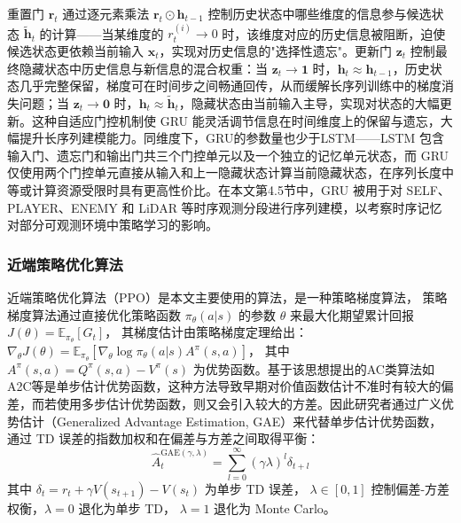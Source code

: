 \documentclass[12pt, a4paper, UTF8]{ctexart}
\numberwithin{equation}{section}
\begin{document}
重置门 $\mathbf{r}_t$ 通过逐元素乘法 $\mathbf{r}_t \odot \mathbf{h}_{t-1}$ 控制历史状态中哪些维度的信息参与候选状态 $\tilde{\mathbf{h}}_t$ 的计算——当某维度的 $r_t^{(i)} \to 0$ 时，该维度对应的历史信息被阻断，迫使候选状态更依赖当前输入 $\mathbf{x}_t$，实现对历史信息的"选择性遗忘"。更新门 $\mathbf{z}_t$ 控制最终隐藏状态中历史信息与新信息的混合权重：当 $\mathbf{z}_t \to \mathbf{1}$ 时，$\mathbf{h}_t \approx \mathbf{h}_{t-1}$，历史状态几乎完整保留，梯度可在时间步之间畅通回传，从而缓解长序列训练中的梯度消失问题；当 $\mathbf{z}_t \to \mathbf{0}$ 时，$\mathbf{h}_t \approx \tilde{\mathbf{h}}_t$，隐藏状态由当前输入主导，实现对状态的大幅更新。这种自适应门控机制使 GRU 能灵活调节信息在时间维度上的保留与遗忘，大幅提升长序列建模能力。同维度下，GRU的参数量也少于LSTM——LSTM 包含输入门、遗忘门和输出门共三个门控单元以及一个独立的记忆单元状态，而 GRU 仅使用两个门控单元直接从输入和上一隐藏状态计算当前隐藏状态，在序列长度中等或计算资源受限时具有更高性价比。在本文第4.5节中，GRU 被用于对 SELF、PLAYER、ENEMY 和 LiDAR 等时序观测分段进行序列建模，以考察时序记忆对部分可观测环境中策略学习的影响。

\subsubsection{近端策略优化算法}
近端策略优化算法（PPO）是本文主要使用的算法，是一种策略梯度算法，
策略梯度算法通过直接优化策略函数 $\pi_{\theta}(a|s)$ 的参数 $\theta$
来最大化期望累计回报 $J(\theta) = \mathbb{E}_{\pi_{\theta}}[G_t]$，
其梯度估计由策略梯度定理\cite{sutton1999policyandvalue}给出：
$\nabla_{\theta} J(\theta) = \mathbb{E}_{\pi_{\theta}}[\nabla_{\theta} \log \pi_{\theta}(a|s) A^{\pi}(s,a)]$，
其中 $A^{\pi}(s,a) = Q^{\pi}(s,a) - V^{\pi}(s)$ 为优势函数。基于该思想提出的AC类算法如A2C等是单步估计优势函数，这种方法导致早期对价值函数估计不准时有较大的偏差，而若使用多步估计优势函数，则又会引入较大的方差。因此研究者通过广义优势估计（Generalized Advantage Estimation, GAE）\cite{schulman2015highdimensional}来代替单步估计优势函数，通过 TD 误差的指数加权和在偏差与方差之间取得平衡：
\begin{equation}
  \hat{A}_t^{\text{GAE}(\gamma,\lambda)} = \sum_{l=0}^{\infty} (\gamma\lambda)^l \delta_{t+l}
  \label{eq:gae}
\end{equation}
其中 $\delta_t = r_t + \gamma V(s_{t+1}) - V(s_t)$ 为单步 TD 误差，
$\lambda \in [0,1]$ 控制偏差-方差权衡，$\lambda = 0$ 退化为单步 TD，
$\lambda = 1$ 退化为 Monte Carlo。
\end{document}
